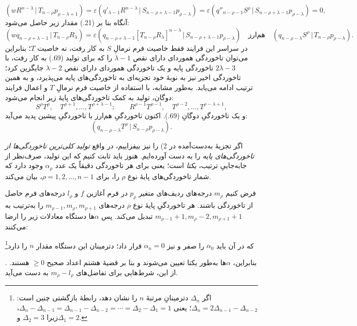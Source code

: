 \documentclass[11pt]{article}
\providecommand{\srcnumdisplay}[3][3.4em]{%
  \par\smallskip\noindent
  \babelsublr{\begin{minipage}[t]{#1}\vspace*{0pt}\srcLTR{#2}\end{minipage}%
  \begin{minipage}[t]{\dimexpr\linewidth-#1\relax}\vspace*{0pt}\centering
  \(\displaystyle #3\)\end{minipage}}\par\smallskip}
\newcommand{\srcLTR}[1]{\relax\ifmmode\text{\mbox{\babelsublr{\foreignlanguage{english}{#1}}}}\else\babelsublr{\foreignlanguage{english}{#1}}\fi}
\newcommand{\srcfn}[2]{\begingroup\renewcommand{\thefootnote}{\srcLTR{#1}}\footnote{#2}\addtocounter{footnote}{-1}\endgroup}
\providecommand{\pair}[2]{(#1\,|\,#2)}
\providecommand{\eps}{\varepsilon}
\begin{document}
\[
 \pair{wR^{n-\lambda}}{T_{n-\rho}p_{\rho-\lambda+1}}
 =\eps\pair{q'_{\lambda-1}R^{n-\lambda}}{S_{n-\rho+\lambda-1}p_{\rho-\lambda}}
 =\eps\pair{q''_{n-\rho-1}S^\rho}{S_{n-\rho+\lambda-1}p_{\rho-\lambda}}=0,
\]
آنگاه بنا بر (21.) مقدار زیر حاصل می‌شود:
\[
 \pair{wq_{n-\rho+\lambda-1}}{T_{n-\rho}R_\lambda}
 =\eps\pair{q_{n-\rho+\lambda-1}[T_{n-\rho}R_\lambda]^{n-\lambda}}{S_{n-\rho+\lambda-1}p_{\rho-\lambda}}
 \quad\text{هم‌ارز}\quad
 \pair{q_{n-\rho-\lambda}S^\rho}{T_{n-\rho}p_{\rho-\lambda}}.
\]
در سراسر این فرایند فقط خاصیت فرم نرمالِ $S$ به کار رفت، نه خاصیت $T$؛ بنابراین می‌توان تاخوردگی هموردای دارای نقص $\lambda-1$ را که برای تولید (69.) به کار رفت، با $2\lambda-3$ تاخوردگی پایه و یک تاخوردگی هموردای دارای نقص $\lambda-2$ جایگزین کرد؛ تاخوردگی اخیر نیز به نوبهٔ خود تجزیه‌ای به تاخوردگی‌های پایه می‌پذیرد، و به همین ترتیب ادامه می‌یابد. به‌طور مشابه، با استفاده از خاصیت فرم نرمالِ $T$ و اعمال فرایند دوگان، تولید به کمک تاخوردگی‌های پایهٔ زیر انجام می‌شود:
\[
 S^\rho T^\rho,\quad T^{\rho+1},\ldots,T^{\rho+\lambda-1};
 \qquad R^{\rho-1}T^{\rho-1},\quad T^{\rho-2},\ldots,T^{\rho-\lambda+1},
\]
و یک تاخوردگیِ دوگانِ (69.). اکنون تاخوردگیِ هم‌ارز با تاخوردگیِ پیشین پدید می‌آید:
\[
 \pair{q_{n-\rho-\lambda}T^\rho}{S_{n-\rho}p_{\rho-\lambda}}.
\]

اگر تجزیهٔ به‌دست‌آمده در 2) را نیز بیفزاییم، در واقع \emph{تولید کلی‌ترین تاخوردگی‌ها از تاخوردگی‌های پایه} را به دست آورده‌ایم. هنوز باید ثابت کنیم که این تولید، صرف‌نظر از جابه‌جاییِ ترتیب، \emph{یکتا} است؛ یعنی برای هر تاخوردگی دقیقاً یک عدد $\alpha_\rho$ وجود دارد که شمار تاخوردگی‌های پایهٔ نوع $\rho$ را، برای $\rho=1,2,\ldots,n-1$، بیان می‌کند.

فرض کنیم $m_\rho$ درجه‌های ردیف‌های متغیر $p_\rho$ در فرم آغازین $f$ و $l_\rho$ درجه‌های فرم حاصل از تاخوردگی باشند. هر تاخوردگیِ پایهٔ نوع $\rho$ درجه‌های $m_{\rho-1},m_\rho,m_{\rho+1}$ را به‌ترتیب به $m_{\rho-1}+1,m_\rho-2,m_{\rho+1}+1$ تبدیل می‌کند. پس $\alpha$ها دستگاه معادلات زیر را ارضا می‌کنند:
\srcnumdisplay[4.2em]{(70.)}{%
 m_\rho-l_\rho=-\alpha_{\rho-1}+2\alpha_\rho-\alpha_{\rho+1},
 \qquad (\rho=1,2,\ldots,n-1)}
که در آن باید $\alpha_0$ را صفر و نیز $\alpha_n=0$ قرار داد؛ دترمینان این دستگاه مقدار $n$ را دارد\srcfn{*)}{اگر $\Delta_n$ دترمینانِ مرتبهٔ $n$ را نشان دهد، رابطهٔ بازگشتی چنین است: $\Delta_n=2\Delta_{n-1}-\Delta_{n-2}$؛ یعنی $\Delta_n-\Delta_{n-1}=\Delta_{n-1}-\Delta_{n-2}=\cdots=\Delta_2-\Delta_1=1$، زیرا $\Delta_2=3$ و$\Delta_1=2$.}. بنابراین، $\alpha$ها به‌طور یکتا تعیین می‌شوند و بنا بر قضیهٔ هشتم اعداد صحیح $\ge0$ هستند. از این، شرط‌هایی برای تفاضل‌های $m_\rho-l_\rho$ به دست می‌آید.
\end{document}
